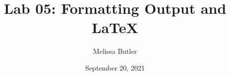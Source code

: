\newcommand{\course}{MATH 3341}
\title{Lab 05: Formatting Output and \LaTeX{}}
\author{Melissa Butler}
\date{September 20, 2021}
